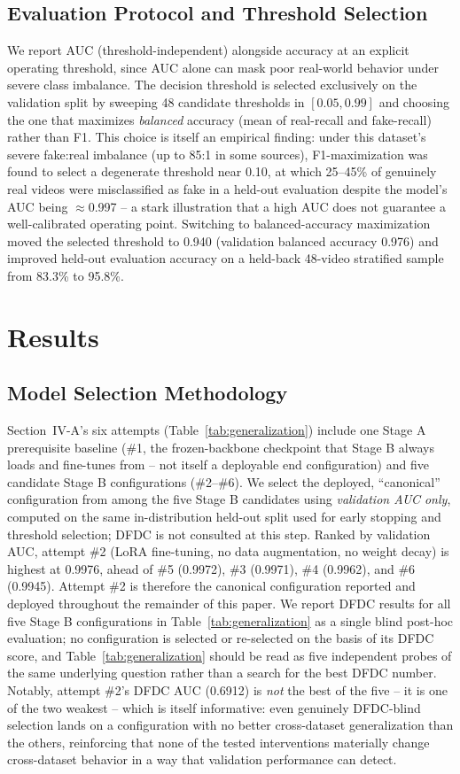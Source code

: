 \documentclass[conference]{IEEEtran}
\begin{document}
\subsection{Evaluation Protocol and Threshold Selection}
We report AUC (threshold-independent) alongside accuracy at an explicit
operating threshold, since AUC alone can mask poor real-world behavior
under severe class imbalance. The decision threshold is selected
exclusively on the validation split by sweeping 48 candidate thresholds in
$[0.05, 0.99]$ and choosing the one that maximizes \emph{balanced}
accuracy (mean of real-recall and fake-recall) rather than F1. This choice
is itself an empirical finding: under this dataset's severe fake:real
imbalance (up to 85:1 in some sources), F1-maximization was found to select
a degenerate threshold near 0.10, at which 25--45\% of genuinely real
videos were misclassified as fake in a held-out evaluation despite the
model's AUC being $\approx$0.997 -- a stark illustration that a high AUC
does not guarantee a well-calibrated operating point. Switching to
balanced-accuracy maximization moved the selected threshold to 0.940
(validation balanced accuracy 0.976) and improved held-out evaluation
accuracy on a held-back 48-video stratified sample from 83.3\% to 95.8\%.

\section{Results}

\subsection{Model Selection Methodology}
Section~IV-A's six attempts (Table~\ref{tab:generalization}) include one
Stage A prerequisite baseline (\#1, the frozen-backbone checkpoint that
Stage B always loads and fine-tunes from -- not itself a deployable
end configuration) and five candidate Stage B configurations (\#2--\#6). We
select the deployed, ``canonical'' configuration from among the five Stage B
candidates using \emph{validation AUC only}, computed on the same
in-distribution held-out split used for early stopping and threshold
selection; DFDC is not consulted at this step. Ranked by validation AUC,
attempt \#2 (LoRA fine-tuning, no data augmentation, no weight decay) is
highest at 0.9976, ahead of \#5 (0.9972), \#3 (0.9971), \#4 (0.9962), and \#6
(0.9945). Attempt \#2 is therefore the canonical configuration reported and
deployed throughout the remainder of this paper. We report DFDC results for
all five Stage B configurations in Table~\ref{tab:generalization} as a
single blind post-hoc evaluation; no configuration is selected or
re-selected on the basis of its DFDC score, and Table~\ref{tab:generalization}
should be read as five independent probes of the same underlying question
rather than a search for the best DFDC number. Notably, attempt \#2's DFDC
AUC (0.6912) is \emph{not} the best of the five -- it is one of the two
weakest -- which is itself informative: even genuinely DFDC-blind selection
lands on a configuration with no better cross-dataset generalization than
the others, reinforcing that none of the tested interventions materially
change cross-dataset behavior in a way that validation performance can
detect.
\end{document}
